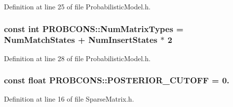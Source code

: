 Definition at line 25 of file Probabilistic\+Model.\+h.

\hypertarget{namespace_p_r_o_b_c_o_n_s_aa757f46fbcab58d09517a449a680db3b}{
\subsubsection[{Num\+Matrix\+Types}]{\setlength{\rightskip}{0pt plus 5cm}const int P\+R\+O\+B\+C\+O\+N\+S\+::\+Num\+Matrix\+Types = {\bf Num\+Match\+States} + Num\+Insert\+States $\ast$ 2}}\label{namespace_p_r_o_b_c_o_n_s_aa757f46fbcab58d09517a449a680db3b}


Definition at line 28 of file Probabilistic\+Model.\+h.

\hypertarget{namespace_p_r_o_b_c_o_n_s_af5a75afbb515bc75473200f8a3ba1993}{
\subsubsection[{P\+O\+S\+T\+E\+R\+I\+O\+R\+\_\+\+C\+U\+T\+O\+F\+F}]{\setlength{\rightskip}{0pt plus 5cm}const float P\+R\+O\+B\+C\+O\+N\+S\+::\+P\+O\+S\+T\+E\+R\+I\+O\+R\+\_\+\+C\+U\+T\+O\+F\+F = 0.}}\label{namespace_p_r_o_b_c_o_n_s_af5a75afbb515bc75473200f8a3ba1993}


Definition at line 16 of file Sparse\+Matrix.\+h.

